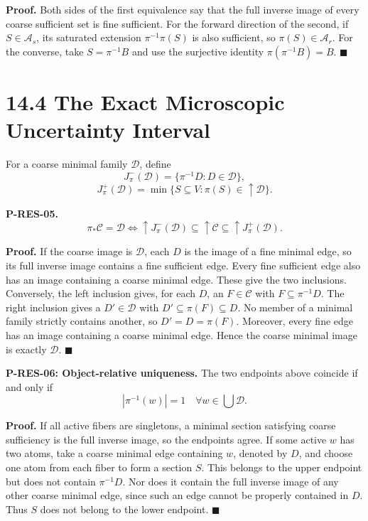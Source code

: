 \documentclass[
  english,
  11pt,
  oneside]{book}
\begin{document}
\textbf{Proof.} Both sides of the first equivalence say that the full inverse image of every coarse sufficient set is fine sufficient. For the forward direction of the second, if \(S\in\mathcal A_s\), its saturated extension \(\pi^{-1}\pi(S)\) is also sufficient, so \(\pi(S)\in\mathcal A_r\). For the converse, take \(S=\pi^{-1}B\) and use the surjective identity \(\pi(\pi^{-1}B)=B\). \(\blacksquare\)

\section{14.4 The Exact Microscopic Uncertainty Interval}\label{the-exact-microscopic-uncertainty-interval}

For a coarse minimal family \(\mathcal D\), define \[J^-_\pi(\mathcal D)=\{\pi^{-1}D:D\in\mathcal D\},\] \[J^+_\pi(\mathcal D)=
\min\{S\subseteq V:\pi(S)\in\uparrow\mathcal D\}.\]

\hypertarget{p-res-05}{}\label{p-res-05}

\textbf{P-RES-05.} \[\pi_*\mathcal C=\mathcal D
\iff
\uparrow J^-_\pi(\mathcal D)
\subseteq\uparrow\mathcal C
\subseteq\uparrow J^+_\pi(\mathcal D).\]

\textbf{Proof.} If the coarse image is \(\mathcal D\), each \(D\) is the image of a fine minimal edge, so its full inverse image contains a fine sufficient edge. Every fine sufficient edge also has an image containing a coarse minimal edge. These give the two inclusions. Conversely, the left inclusion gives, for each \(D\), an \(F\in\mathcal C\) with \(F\subseteq\pi^{-1}D\). The right inclusion gives a \(D'\in\mathcal D\) with \(D'\subseteq\pi(F)\subseteq D\). No member of a minimal family strictly contains another, so \(D'=D=\pi(F)\). Moreover, every fine edge has an image containing a coarse minimal edge. Hence the coarse minimal image is exactly \(\mathcal D\). \(\blacksquare\)

\hypertarget{p-res-06}{}\label{p-res-06}

\textbf{P-RES-06: Object-relative uniqueness.} The two endpoints above coincide if and only if \[|\pi^{-1}(w)|=1
\quad\forall w\in\bigcup\mathcal D.\]

\textbf{Proof.} If all active fibers are singletons, a minimal section satisfying coarse sufficiency is the full inverse image, so the endpoints agree. If some active \(w\) has two atoms, take a coarse minimal edge containing \(w\), denoted by \(D\), and choose one atom from each fiber to form a section \(S\). This belongs to the upper endpoint but does not contain \(\pi^{-1}D\). Nor does it contain the full inverse image of any other coarse minimal edge, since such an edge cannot be properly contained in \(D\). Thus \(S\) does not belong to the lower endpoint. \(\blacksquare\)
\end{document}
